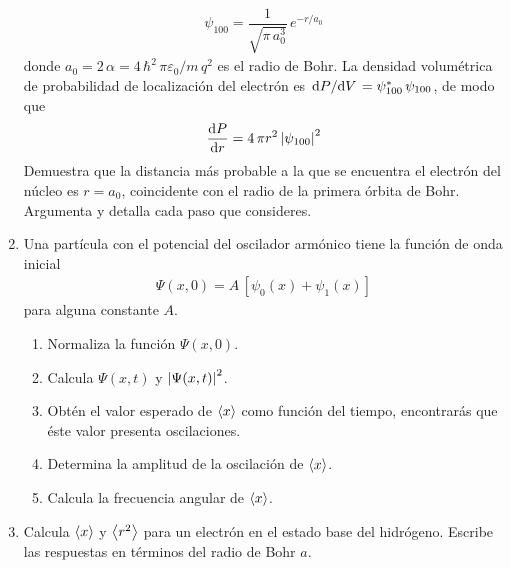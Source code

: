\begin{enumerate}
\begin{align*}
\psi_{100} = \dfrac{1}{\sqrt{\pi \, a_{0}^{3}}} \, e^{-r/a_{0}}\end{align*}
donde $a_{0} = 2 \, \alpha = 4 \, \hbar^{2} \, \pi \varepsilon_{0}/ m \,q^{2}$ es el radio de Bohr. La densidad volumétrica de probabilidad de localización del electrón es $\dv*{P}{V} = \psi_{100}^{*} \, \psi_{100}$, de modo que 
\begin{align*}
\dv{P}{r} = 4 \, \pi r^{2} \, \abs{\psi_{100}}^{2}
\end{align*}
Demuestra que la distancia más probable a la que se encuentra el electrón del núcleo es $r = a_{0}$, coincidente con el radio de la primera órbita de Bohr. Argumenta y detalla cada paso que consideres.
\item Una partícula con el potencial del oscilador armónico tiene la función de onda inicial
\begin{align*}
\Psi (x, 0) = A \, [\psi_{0} (x) + \psi_{1} (x) ]
\end{align*}
para alguna constante $A$.
\begin{enumerate}
\item Normaliza la función $\Psi (x, 0)$.
\item Calcula $\Psi (x, t)$ y $\abs{\Psi (x, t)}^{2}$.
\item Obtén el valor esperado de $\expval{x}$ como función del tiempo, encontrarás que éste valor presenta oscilaciones. 
\item Determina la amplitud de la oscilación de $\expval{x}$.
\item Calcula la frecuencia angular de $\expval{x}$.
\end{enumerate}
\item Calcula $\expval{x}$ y $\expval{r^{2}}$ para un electrón en el estado base del hidrógeno. Escribe las respuestas en términos del radio de Bohr $a$.
\end{enumerate}
